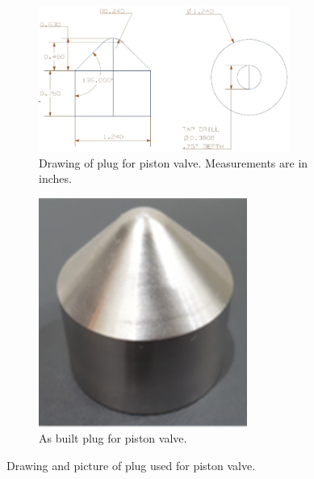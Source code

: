 \begin{figure}[tb]
    \vspace{16pt}
    \centering
    \begin{subfigure}[t]{0.6\textwidth}
        \centering
        \includegraphics[width=0.9\textwidth]{design/photos/plug_gen1_drawing.PNG}
        \caption{Drawing of plug for piston valve. Measurements are in inches.}
        \label{fig:plug draw}
    \end{subfigure}
    \hfill
    \begin{subfigure}[t]{0.35\textwidth}
        \centering
        \includegraphics[width=0.75\textwidth]{design/photos/cobalt_plug.png}
        \caption{As built plug for piston valve.}
        \label{fig:cobalt plug}
    \end{subfigure}
    \caption{Drawing and picture of plug used for piston valve.}
    \label{fig:plug}
    \vspace{16pt}
\end{figure}

